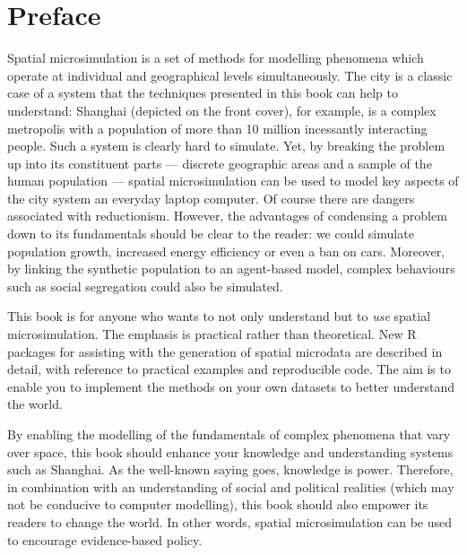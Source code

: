 \chapter*{Preface}

Spatial microsimulation is a set of methods for modelling phenomena which operate
at individual and geographical levels simultaneously.
The city is a classic case of a system that the techniques
presented in this book can help to understand: Shanghai
(depicted on the front cover), for example, is a complex metropolis with a
population of more than 10 million incessantly interacting people. Such a system is clearly hard
to simulate. Yet, by breaking the problem up into its
constituent parts --- discrete geographic areas and a sample of the human
population --- spatial microsimulation can be used to model key aspects of the city system
an everyday laptop computer. Of course there are dangers associated with reductionism.
However, the advantages of condensing a problem down to its fundamentals
should be clear to the reader:
we could simulate population growth, increased energy efficiency or even
a ban on cars. Moreover, by linking the synthetic population
to an agent-based model, complex
behaviours such as social segregation could also be simulated.

This book is for anyone who wants to not only understand
but to \emph{use} spatial microsimulation.
The emphasis is practical rather than theoretical.
New R packages for assisting with the generation of spatial microdata are described in
detail, with reference to practical examples and reproducible code.
The aim is to enable you to implement the methods on your own
datasets to better understand the world. 

By enabling the modelling of the fundamentals of
complex phenomena that vary over space,
this book should enhance your knowledge and understanding
systems such as Shanghai.
As the well-known saying goes, knowledge is power.
Therefore, in combination with an understanding of social and
political realities (which may not be conducive to computer modelling),
this book should also empower its readers to change the world.
In other words,
spatial microsimulation can be used to encourage evidence-based policy.


